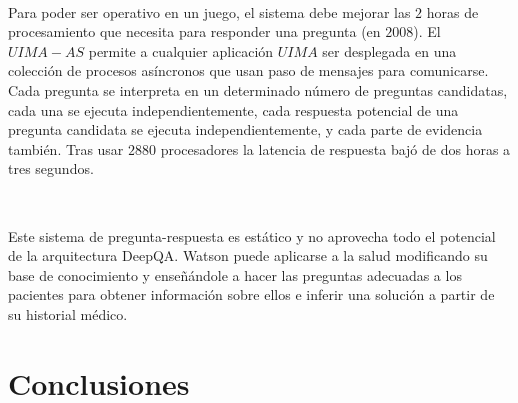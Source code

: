 \documentclass[paper=a4, fontsize=10pt]{scrartcl} %
\numberwithin{equation}{section} %
\numberwithin{figure}{section} %
\numberwithin{table}{section} %
\begin{document}
\

Para poder ser operativo en un juego, el sistema debe mejorar las $2$ horas de procesamiento que necesita para responder una pregunta (en $2008$).
El $UIMA-AS$ permite a cualquier aplicación $UIMA$ ser desplegada en una colección de procesos asíncronos que usan paso de mensajes para comunicarse.
Cada pregunta se interpreta en un determinado número de preguntas candidatas, cada una se ejecuta independientemente, cada respuesta potencial de una pregunta candidata se ejecuta independientemente, y cada parte de evidencia también.
Tras usar $2880$ procesadores la latencia de respuesta bajó de dos horas a tres segundos. %

\

Este sistema de pregunta-respuesta es estático y no aprovecha todo el potencial de la arquitectura DeepQA.
Watson puede aplicarse a la salud modificando su base de conocimiento y enseñándole a hacer las preguntas adecuadas a los pacientes para obtener información sobre ellos e inferir una solución a partir de su historial médico.




\section{Conclusiones}




\newpage
\end{document}
